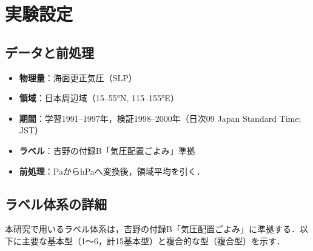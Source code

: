 \documentclass{jarticle}
\theoremstyle{definition}
\begin{document}
\section{実験設定}
\subsection{データと前処理}
\begin{itemize}
\item \textbf{物理量}：海面更正気圧（SLP）
\item \textbf{領域}：日本周辺域（15–55°N, 115–155°E）
\item \textbf{期間}：学習1991–1997年，検証1998–2000年（日次09 Japan Standard Time; JST）
\item \textbf{ラベル}：吉野\cite{吉野2002日本の気候}の付録B「気圧配置ごよみ」準拠
\item \textbf{前処理}：PaからhPaへ変換後，領域平均を引く．
\end{itemize}
\subsection{ラベル体系の詳細}
本研究で用いるラベル体系は，吉野\cite{吉野2002日本の気候}の付録B「気圧配置ごよみ」に準拠する．以下に主要な基本型（1〜6，計15基本型）と複合的な型（複合型）を示す．
\end{document}
